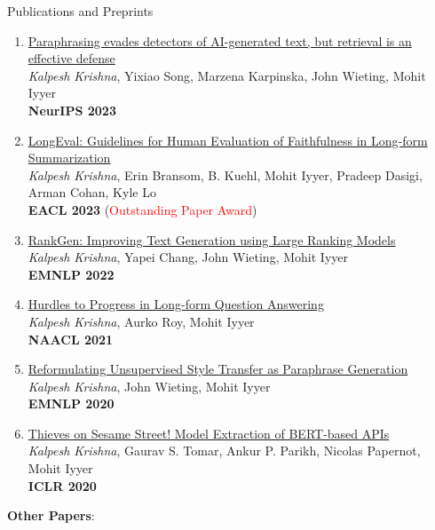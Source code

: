 \documentclass{resume} %
\begin{document}
\begin{rSection}{Publications and Preprints}
\begin{enumerate}[leftmargin=*]
\item \href{https://arxiv.org/abs/2303.13408}{Paraphrasing evades detectors of AI-generated text, but retrieval is an effective defense} \\
\textit{Kalpesh Krishna}, Yixiao Song, Marzena Karpinska, John Wieting, Mohit Iyyer \\
\textbf{NeurIPS 2023}

\item \href{https://arxiv.org/abs/2301.13298}{LongEval: Guidelines for Human Evaluation of Faithfulness in Long-form Summarization} \\
\textit{Kalpesh Krishna}, Erin Bransom, B. Kuehl, Mohit Iyyer, Pradeep Dasigi, Arman Cohan, Kyle Lo \\
\textbf{EACL 2023} (\textcolor{red}{Outstanding Paper Award})

\item \href{https://arxiv.org/abs/2205.09726}{RankGen: Improving Text Generation using Large Ranking Models} \\
\textit{Kalpesh Krishna}, Yapei Chang, John Wieting, Mohit Iyyer \\
\textbf{EMNLP 2022}


\item \href{https://arxiv.org/abs/2103.06332}{Hurdles to Progress in Long-form Question Answering} \\
\textit{Kalpesh Krishna}, Aurko Roy, Mohit Iyyer \\
\textbf{NAACL 2021}
\item \href{https://arxiv.org/abs/2010.05700}{Reformulating Unsupervised Style Transfer as Paraphrase Generation} \\ \textit{Kalpesh Krishna}, John Wieting, Mohit Iyyer \\ \textbf{EMNLP 2020} 
\item \href{https://arxiv.org/abs/1910.12366}{Thieves on Sesame Street! Model Extraction of BERT-based APIs} \\ \textit{Kalpesh Krishna}, Gaurav S. Tomar, Ankur P. Parikh, Nicolas Papernot, Mohit Iyyer \\ \textbf{ICLR 2020}

\end{enumerate}

\vspace{0.1in}

\textbf{Other Papers}:
\begin{enumerate}[leftmargin=*]
\setlength\itemsep{0.4em}
\setcounter{enumi}{11}


\end{enumerate}
\end{rSection}
\end{document}
